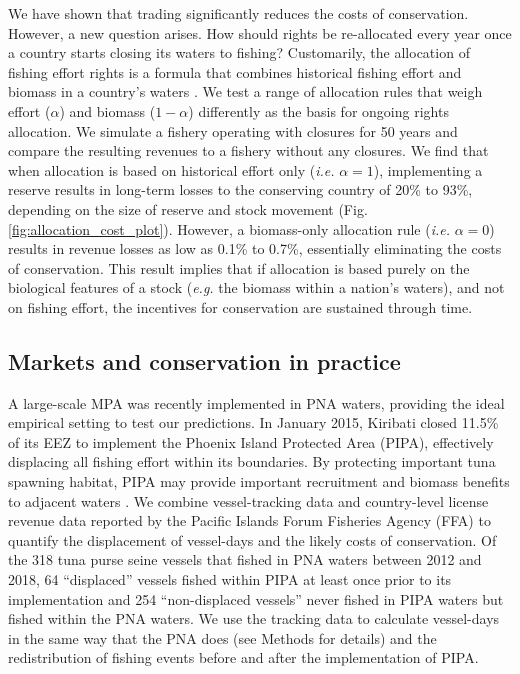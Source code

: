 \documentclass[12pt]{article}
\begin{document}
We have shown that trading significantly reduces the costs of conservation. However, a new question arises. How should rights be re-allocated every year once a country starts closing its waters to fishing? Customarily, the allocation of fishing effort rights is a formula that combines historical fishing effort and biomass in a country's waters \cite{havice_2013}. We test a range of allocation rules that weigh effort ($\alpha$) and biomass ($1 - \alpha$) differently as the basis for ongoing rights allocation. We simulate a fishery operating with closures for 50 years and compare the resulting revenues to a fishery without any closures. We find that when allocation is based on historical effort only (\emph{i.e.} $\alpha = 1$), implementing a reserve results in long-term losses to the conserving country of 20\% to 93\%, depending on the size of reserve and stock movement (Fig. \ref{fig:allocation_cost_plot}). However, a biomass-only allocation rule (\emph{i.e.} $\alpha = 0$) results in revenue losses as low as 0.1\% to 0.7\%, essentially eliminating the costs of conservation. This result implies that if allocation is based purely on the biological features of a stock (\emph{e.g.} the biomass within a nation's waters), and not on fishing effort, the incentives for conservation are sustained through time.

\subsection{Markets and conservation in practice}

A large-scale MPA was recently implemented in PNA waters, providing the ideal empirical setting to test our predictions. In January 2015, Kiribati closed 11.5\% of its EEZ to implement the Phoenix Island Protected Area (PIPA), effectively displacing all fishing effort within its boundaries\cite{mccauley_2016,mcdermott_2018}. By protecting important tuna spawning habitat, PIPA may provide important recruitment and biomass benefits to adjacent waters \cite{hernndez_2019}. We combine vessel-tracking data \cite{kroodsma_2018} and country-level license revenue data reported by the Pacific Islands Forum Fisheries Agency (FFA) \cite{ffa_2017} to quantify the displacement of vessel-days and the likely costs of conservation. Of the 318 tuna purse seine vessels that fished in PNA waters between 2012 and 2018, 64 ``displaced'' vessels fished within PIPA at least once prior to its implementation and 254 ``non-displaced vessels'' never fished in PIPA waters but fished within the PNA waters. We use the tracking data to calculate vessel-days in the same way that the PNA does (see Methods for details) and the redistribution of fishing events before and after the implementation of PIPA.
\end{document}
